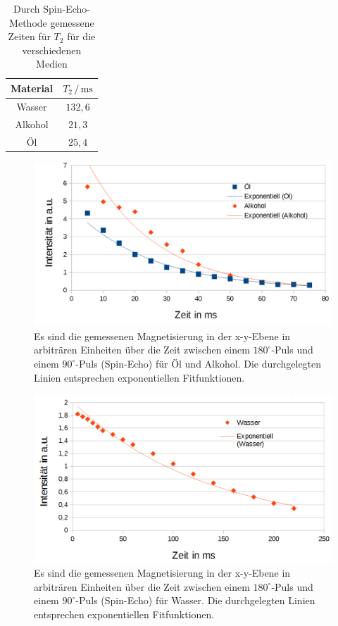 \documentclass[numbers=noenddot,a4paper,notitlepage,twoside,BCOR15mm]{scrartcl}
\begin{document}
	\begin{table}[h]
		\centering
		\caption{Durch Spin-Echo-Methode gemessene Zeiten für $T_2$ für die verschiedenen Medien}
		\begin{tabular}{c c}
			Material & $T_2\,/\,\mathrm{ms}$  \\ \hline
			Wasser 	& $132,6$  \\
			Alkohol & $21,3$  \\
			Öl 		& $25,4$ 
		\end{tabular}
		\label{tab:1T2}
	\end{table}
	\begin{figure}[h]
		\centering
		\includegraphics[width=1\textwidth]{pics/T2_1}
			\caption{Es sind die gemessenen Magnetisierung in der x-y-Ebene in arbiträren Einheiten über die Zeit zwischen einem $180^\circ$-Puls und einem $90^\circ$-Puls (Spin-Echo) für Öl und Alkohol. Die durchgelegten Linien entsprechen exponentiellen Fitfunktionen.}
			\label{abb:T2_1}
	\end{figure}
	\begin{figure}[h]
	\centering
	\includegraphics[width=1\textwidth]{pics/T2_2}
			\caption{Es sind die gemessenen Magnetisierung in der x-y-Ebene in arbiträren Einheiten über die Zeit zwischen einem $180^\circ$-Puls und einem $90^\circ$-Puls (Spin-Echo) für Wasser. Die durchgelegten Linien entsprechen exponentiellen Fitfunktionen.}
	\label{abb:T2_2}
	\end{figure}
\end{document}
